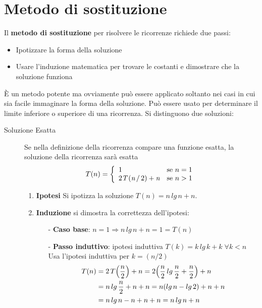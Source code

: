 \documentclass[10pt, a4paper]{report}
\begin{document}
\section{Metodo di sostituzione}
Il \textbf{metodo di sostituzione} per risolvere le ricorrenze richiede due passi:
\begin{itemize}
\item Ipotizzare la forma della soluzione
\item Usare l'induzione matematica per trovare le costanti e dimostrare che la soluzione funziona
\end{itemize}
È un metodo potente ma ovviamente può essere applicato soltanto nei casi in cui sia facile immaginare la forma della soluzione. Può essere usato per determinare il limite inferiore o superiore di una ricorrenza. Si distinguono due soluzioni:
\begin{description}
\item[Soluzione Esatta] Se nella definizione della ricorrenza compare una funzione esatta, la soluzione della ricorrenza sarà esatta
\begin{equation*}
T(n) = \left\{
\begin{array}{ll}
1 & \text{se $n = 1$} \\
2\textit{T\,}(\textit{n}\,/\,2) + \textit{n} & \text{se $n > 1$}
\end{array}\right.
\end{equation*}
\begin{enumerate}
\item \textbf{Ipotesi} Si ipotizza la soluzione $T(n) = n\,lg\,n + n$.
\item \textbf{Induzione} si dimostra la correttezza dell'ipotesi:
\begin{itemize}
\item[-]\textbf{Caso base}: $n = 1 \Rightarrow n\,lg\,n + n = 1 = T(n)$
\item[-]\textbf{Passo induttivo}: ipotesi induttiva $T(k) = k\,lg\,k + k \;\forall k < n$\\Usa l'ipotesi induttiva per $k = (n/2)$
\begin{align*}
T(n) &= 2\,T\Bigl(\frac{n}{2}\Bigr) + n = 2\Bigl(\frac{n}{2}\,lg\,\frac{n}{2} + \frac{n}{2}\Bigr) + n \\
&= n\,lg\,\frac{n}{2} + n + n = n(lg\,n - lg\,2) + n + n \\
&=n\,lg\,n - n + n + n = n\,lg\,n + n 
\end{align*}
\end{itemize}
\end{enumerate}

\end{description}
\end{document}
